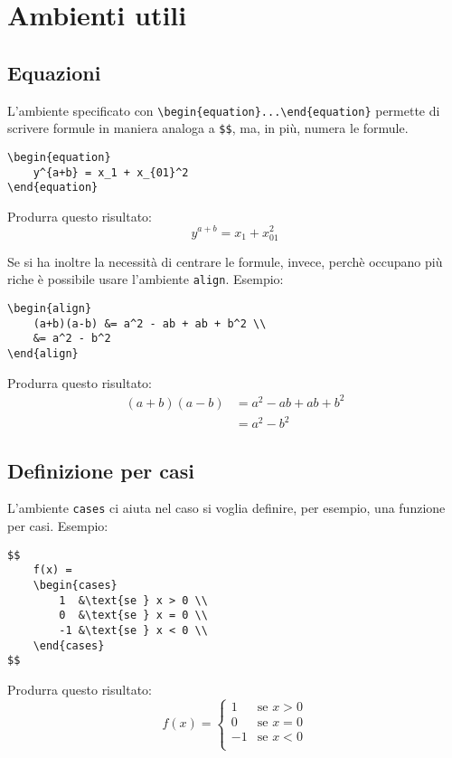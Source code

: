 \section{Ambienti utili}

\subsection{Equazioni}
L'ambiente specificato con \verb!\begin{equation}...\end{equation}! permette 
di scrivere formule in maniera analoga a \verb!$$!, ma, in più, numera le 
formule.
\begin{lstlisting}
\begin{equation}
    y^{a+b} = x_1 + x_{01}^2
\end{equation}
\end{lstlisting}
Produrra questo risultato:\\
\begin{equation}
    y^{a+b} = x_1 + x_{01}^2
\end{equation}
\par
Se si ha inoltre la necessità di centrare le formule, invece, perchè occupano 
più riche è possibile usare l'ambiente \verb!align!. Esempio:
\begin{lstlisting}
\begin{align}
    (a+b)(a-b) &= a^2 - ab + ab + b^2 \\
    &= a^2 - b^2
\end{align}
\end{lstlisting}
Produrra questo risultato:\\
\begin{align}
    (a+b)(a-b) &= a^2 - ab + ab + b^2 \\
    &= a^2 - b^2
\end{align}

\subsection{Definizione per casi}
L'ambiente \verb!cases! ci aiuta nel caso si voglia definire, per esempio, una 
funzione per casi. Esempio:
\begin{lstlisting}
$$
    f(x) = 
    \begin{cases}
        1  &\text{se } x > 0 \\
        0  &\text{se } x = 0 \\
        -1 &\text{se } x < 0 \\
    \end{cases}
$$
\end{lstlisting}
Produrra questo risultato:\\
$$
    f(x) = 
    \begin{cases}
        1  &\text{se } x > 0 \\
        0  &\text{se } x = 0 \\
        -1 &\text{se } x < 0 \\
    \end{cases}
$$